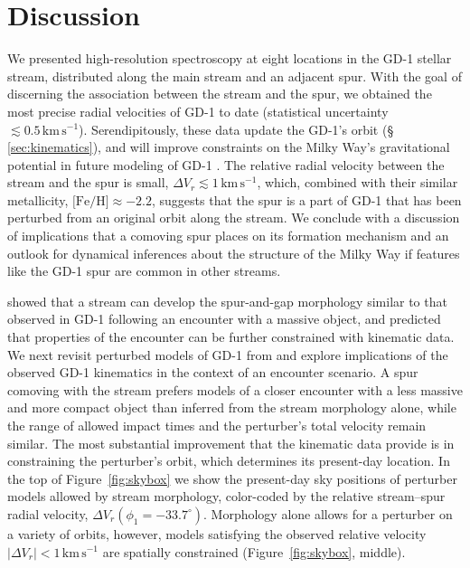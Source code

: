 \documentclass[twocolumn]{aastex63}
\newcommand{\kms}{\ensuremath{\textrm{km}\,\textrm{s}^{-1}}}
\newcommand{\feh}{\ensuremath{\textrm{[Fe/H]}}}
\begin{document}
\section{Discussion}
\label{sec:discussion}

We presented high-resolution spectroscopy at eight locations in the GD-1 stellar stream, distributed along the main stream and an adjacent spur.
With the goal of discerning the association between the stream and the spur, we obtained the most precise radial velocities of GD-1 to date (statistical uncertainty $\lesssim0.5\,\kms$).
Serendipitously, these data update the GD-1's orbit (\S\,\ref{sec:kinematics}), and will improve constraints on the Milky Way's gravitational potential in future modeling of GD-1 \citep[similar to, e.g.,][]{koposov2010, bowden2015, bovy2016}.
The relative radial velocity between the stream and the spur is small, $\Delta V_r\lesssim1\,\kms$, which, combined with their similar metallicity, $\feh\approx-2.2$, suggests that the spur is a part of GD-1 that has been perturbed from an original orbit along the stream.
We conclude with a discussion of implications that a comoving spur places on its formation mechanism and an outlook for dynamical inferences about the structure of the Milky Way if features like the GD-1 spur are common in other streams.

\citet{bonaca2019a} showed that a stream can develop the spur-and-gap morphology similar to that observed in GD-1 following an encounter with a massive object, and predicted that properties of the encounter can be further constrained with kinematic data.
We next revisit perturbed models of GD-1 from \citet{bonaca2019a} and explore implications of the observed GD-1 kinematics in the context of an encounter scenario.
A spur comoving with the stream prefers models of a closer encounter with a less massive and more compact object than inferred from the stream morphology alone, while the range of allowed impact times and the perturber's total velocity remain similar.
The most substantial improvement that the kinematic data provide is in constraining the perturber's orbit, which determines its present-day location.
In the top of Figure~\ref{fig:skybox} we show the present-day sky positions of perturber models allowed by stream morphology, color-coded by the relative stream--spur radial velocity, $\Delta V_r(\phi_1=-33.7^\circ)$.
Morphology alone allows for a perturber on a variety of orbits, however, models satisfying the observed relative velocity $|\Delta V_r|<1\,\kms$ are spatially constrained (Figure~\ref{fig:skybox}, middle).
\end{document}
